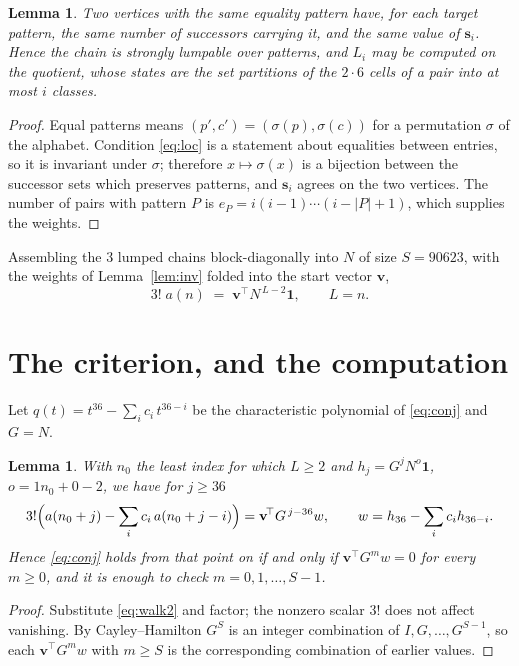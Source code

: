 \documentclass[11pt,a4paper]{article}
\theoremstyle{plain}
\newtheorem{lemma}[theorem]{Lemma}
\theoremstyle{definition}
\begin{document}
\begin{lemma}\label{lem:lump}
Two vertices with the same equality pattern have, for each target pattern, the same number of
successors carrying it, and the same value of $\mathbf{s}_i$. Hence the chain is strongly
lumpable over patterns, and $L_i$ may be computed on the quotient, whose states are the set
partitions of the $2\cdot6$ cells of a pair into at most $i$ classes.
\end{lemma}

\begin{proof}
Equal patterns means $(p',c')=(\sigma(p),\sigma(c))$ for a permutation $\sigma$ of the
alphabet. Condition \eqref{eq:loc} is a statement about equalities between entries, so it is
invariant under $\sigma$; therefore $x\mapsto\sigma(x)$ is a bijection between the successor
sets which preserves patterns, and $\mathbf{s}_i$ agrees on the two vertices. The number of
pairs with pattern $P$ is $e_P=i(i-1)\cdots(i-|P|+1)$, which supplies the weights.
\end{proof}

Assembling the $3$ lumped chains block-diagonally into $N$ of size $S=90623$, with the
weights of Lemma~\ref{lem:inv} folded into the start vector $\mathbf{v}$,
\begin{equation}\label{eq:walk2}
3!\;a(n)\;=\;\mathbf{v}^{\!\top}N^{\,L-2}\mathbf{1},\qquad L=n .
\end{equation}

\section{The criterion, and the computation}

Let $q(t)=t^{36}-\sum_i c_i\,t^{36-i}$ be the characteristic polynomial of
\eqref{eq:conj} and $G=N$.

\begin{lemma}\label{lem:crit}
With $n_0$ the least index for which $L\ge2$ and $h_j=G^{j}N^{o}\mathbf{1}$,
$o=1n_0+0-2$, we have for $j\ge36$
\[
3!\Bigl(a(n_0+j)-\sum_i c_i\,a(n_0+j-i)\Bigr)
=\mathbf{v}^{\!\top}G^{\,j-36}w,\qquad
w=h_{36}-\sum_i c_i h_{36-i} .
\]
Hence \eqref{eq:conj} holds from that point on if and only if
$\mathbf{v}^{\!\top}G^{m}w=0$ for every $m\ge0$, and it is enough to check
$m=0,1,\dots,S-1$.
\end{lemma}

\begin{proof}
Substitute \eqref{eq:walk2} and factor; the nonzero scalar $3!$ does not affect
vanishing. By Cayley--Hamilton $G^{S}$ is an integer combination of $I,G,\dots,G^{S-1}$,
so each $\mathbf{v}^{\!\top}G^{m}w$ with $m\ge S$ is the corresponding combination of
earlier values.
\end{proof}
\end{document}
